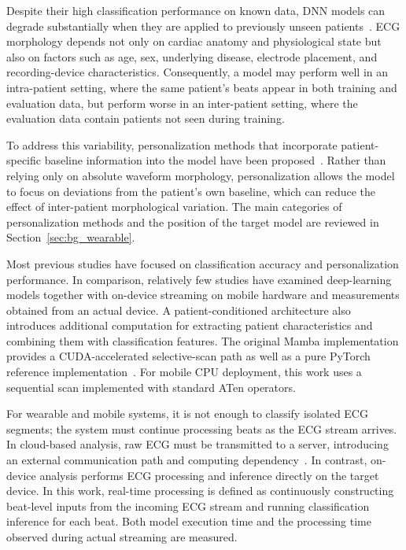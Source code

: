 Despite their high classification performance on known data, DNN models can degrade substantially when they are applied to previously unseen patients~\cite{llamedo2011heartbeat,jeong2024enhancing}.
ECG morphology depends not only on cardiac anatomy and physiological state but also on factors such as age, sex, underlying disease, electrode placement, and recording-device characteristics.
Consequently, a model may perform well in an intra-patient setting, where the same patient's beats appear in both training and evaluation data, but perform worse in an inter-patient setting, where the evaluation data contain patients not seen during training.

To address this variability, personalization methods that incorporate patient-specific baseline information into the model have been proposed~\cite{xu2019ivector, heo2026resumamba, fan2025class}.
Rather than relying only on absolute waveform morphology, personalization allows the model to focus on deviations from the patient's own baseline, which can reduce the effect of inter-patient morphological variation.
The main categories of personalization methods and the position of the target model are reviewed in Section~\ref{sec:bg_wearable}.

Most previous studies have focused on classification accuracy and personalization performance.
In comparison, relatively few studies have examined deep-learning models together with on-device streaming on mobile hardware and measurements obtained from an actual device.
A patient-conditioned architecture also introduces additional computation for extracting patient characteristics and combining them with classification features.
The original Mamba implementation provides a CUDA-accelerated selective-scan path as well as a pure PyTorch reference implementation~\cite{gu2023mamba}.
For mobile CPU deployment, this work uses a sequential scan implemented with standard ATen operators.

For wearable and mobile systems, it is not enough to classify isolated ECG segments; the system must continue processing beats as the ECG stream arrives.
In cloud-based analysis, raw ECG must be transmitted to a server, introducing an external communication path and computing dependency~\cite{park2024realtime}.
In contrast, on-device analysis performs ECG processing and inference directly on the target device.
In this work, real-time processing is defined as continuously constructing beat-level inputs from the incoming ECG stream and running classification inference for each beat.
Both model execution time and the processing time observed during actual streaming are measured.

